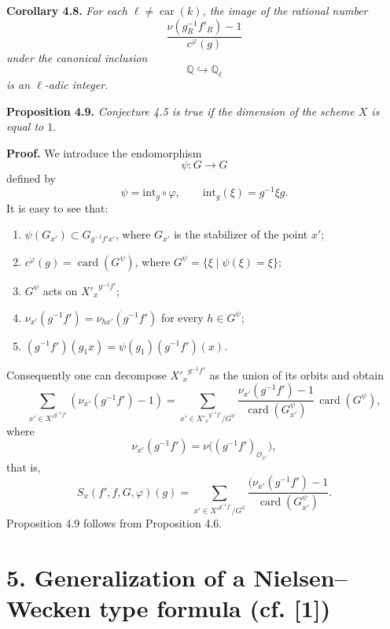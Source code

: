 \documentclass[11pt]{article}
\providecommand{\car}{\operatorname{car}}
\providecommand{\car}{\operatorname{car}}
\providecommand{\bQ}{\mathbb Q}
\providecommand{\card}{\operatorname{card}}
\providecommand{\car}{\operatorname{car}}
\begin{document}
\medskip
\noindent
\textbf{Corollary 4.8.} \emph{For each $\ell\ne\car(k)$, the image of the rational number
\[
\frac{\nu(g_R^{-1}f'_R)-1}{c^\varphi(g)}
\]
under the canonical inclusion
\[
\bQ\hookrightarrow \bQ_\ell
\]
is an $\ell$-adic integer.}

\medskip
\noindent
\textbf{Proposition 4.9.} \emph{Conjecture 4.5 is true if the dimension of the scheme $X$ is equal to $1$.}

\medskip
\noindent
\textbf{Proof.} We introduce the endomorphism
\[
\psi:G\longrightarrow G
\]
defined by
\[
\psi=\mathrm{int}_g\circ\varphi,
\qquad \mathrm{int}_g(\xi)=g^{-1}\xi g.
\]
It is easy to see that:
\begin{enumerate}
\item[i)] $\psi(G_{x'})\subset G_{g^{-1}f'x'}$, where $G_{x'}$ is the stabilizer of the point $x'$;
\item[ii)] $c^\varphi(g)=\card(G^\psi)$, where $G^\psi=\{\xi\mid\psi(\xi)=\xi\}$;
\item[iii)] $G^\psi$ acts on ${X'_x}^{g^{-1}f'}$;
\item[iv)] $\nu_{x'}(g^{-1}f')=\nu_{hx'}(g^{-1}f')$ for every $h\in G^\psi$;
\item[v)] $(g^{-1}f')(g_1x)=\psi(g_1)(g^{-1}f')(x)$.
\end{enumerate}
Consequently one can decompose ${X'_x}^{g^{-1}f'}$ as the union of its orbits and obtain
\begin{equation}\tag{4.9.1}
\sum_{x'\in {X'}^{g^{-1}f'}}(\nu_{x'}(g^{-1}f')-1)
=
\sum_{x'\in {X'_x}^{g^{-1}f'}/G^\psi}
\frac{\nu_{x'}(g^{-1}f')-1}{\card(G^\psi_{x'})}\,\card(G^\psi),
\end{equation}
where
\[
\nu_{x'}(g^{-1}f')=\nu\bigl((g^{-1}f')_{\mathcal O_{x'}}\bigr),
\]
that is,
\begin{equation}\tag{4.9.2}
S_x(f',f,G,\varphi)(g)=\sum_{x'\in {X'}^{g^{-1}f'}/G^\psi}
\frac{(\nu_{x'}(g^{-1}f')-1}{\card(G^\psi_{x'})}.
\end{equation}
Proposition 4.9 follows from Proposition 4.6.

\section*{5. Generalization of a Nielsen--Wecken type formula {\normalfont (cf. [1])}}
\end{document}
